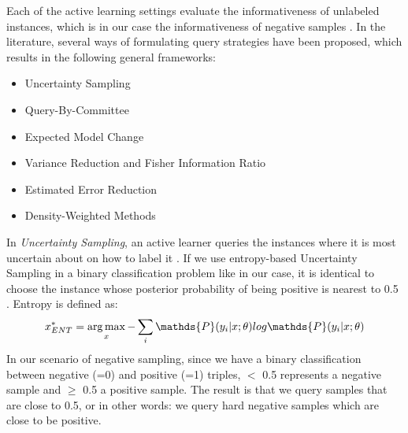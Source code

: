 Each of the active learning settings evaluate the informativeness of unlabeled
instances, which is in our case the informativeness of negative samples \cite{Settles2009ActiveLL}.
In the literature, several ways of formulating query strategies have been proposed, which results in the following general frameworks:
\begin{itemize}
    \item Uncertainty Sampling
    \item Query-By-Committee
    \item Expected Model Change
    \item Variance Reduction and Fisher Information Ratio
    \item Estimated Error Reduction
    \item Density-Weighted Methods
\end{itemize}
In \textit{Uncertainty Sampling}, an active learner queries the instances where it is most uncertain about on how to label it \cite{Settles2009ActiveLL}.
If we use entropy-based Uncertainty Sampling in a binary classification problem like in our case, it is identical to choose the instance whose posterior probability of being positive is nearest to 0.5 \cite{Settles2009ActiveLL}.
Entropy is defined as:
$$x^{*}_{ENT} = \argmax_{x} - \sum_{i}{\mathds{P}(y_i | x; \theta) log \mathds{P}(y_i|x; \theta)}$$
In our scenario of negative sampling, since we have a binary classification between negative (=0) and positive (=1) triples, $<$ 0.5 represents a negative sample and $\geq$ 0.5 a positive sample.
The result is that we query samples that are close to 0.5, or in other words:
we query hard negative samples which are close to be positive.

